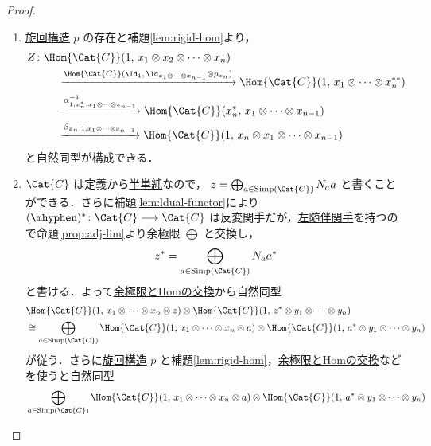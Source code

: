 \documentclass[TQFT_main]{subfiles}
\begin{document}
\begin{proof}
    \begin{enumerate}
        \item \hyperref[def:pivotal]{旋回構造} $p$ の存在と補題\ref{lem:rigid-hom}より，
        \begin{align}
            Z &\colon \Hom{\Cat{C}} (1,\, x_1 \otimes x_2 \otimes \cdots \otimes x_n) \\
            &\qquad \xrightarrow{\Hom{\Cat{C}} (\Id_1,\, \Id_{x_1 \otimes \cdots \otimes x_{n-1}} \otimes p_{x_n})} \Hom{\Cat{C}} (1,\, x_1 \otimes \cdots \otimes x_n^{**})  \\
            &\qquad \xrightarrow{\alpha_{1,x_n^*,x_1\otimes \cdots \otimes x_{n-1}}^{-1}} \Hom{\Cat{C}} (x_n^{*},\, x_1 \otimes \cdots \otimes x_{n-1}) \\
            &\qquad \xrightarrow{\beta_{x_n,1,x_1 \otimes \cdots \otimes x_{n-1}}} \Hom{\Cat{C}} (1,\, x_n \otimes x_1 \otimes \cdots \otimes x_{n-1})
        \end{align}
        と自然同型が構成できる．
        \item $\Cat{C}$ は定義から\hyperref[def:semisimple-cat]{半単純}なので，
        $z = \bigoplus_{a \in \mathrm{Simp}(\Cat{C})} N_a a$ と書くことができる．さらに補題\ref{lem:ldual-functor}により $(\mhyphen)^* \colon \Cat{C} \lto \Cat{C}$ は反変関手だが，\hyperref[def:adjoint]{左随伴関手}を持つので命題\ref{prop:adj-lim}より余極限 $\bigoplus$ と交換し，
        \begin{align}
            z^* = \bigoplus_{a \in \mathrm{Simp}(\Cat{C})} N_a a^*
        \end{align}
        と書ける．よって\hyperref[prop:lim-colim-basic]{余極限とHomの交換}から自然同型
        \begin{align}
            &\Hom{\Cat{C}} (1,\, x_1 \otimes \cdots \otimes x_n \otimes z) \otimes  \Hom{\Cat{C}}(1,\, z^* \otimes y_1 \otimes \cdots \otimes y_n) \\
            &\cong \bigoplus_{a \in \mathrm{Simp}(\Cat{C})} \Hom{\Cat{C}} (1,\, x_1 \otimes \cdots \otimes x_n \otimes a) \otimes  \Hom{\Cat{C}}(1,\, a^* \otimes y_1 \otimes \cdots \otimes y_n)
        \end{align}
        が従う．さらに\hyperref[def:pivotal]{旋回構造} $p$ と補題\ref{lem:rigid-hom}，\hyperref[prop:lim-colim-basic]{余極限とHomの交換}などを使うと自然同型
        \begin{align}
            &\bigoplus_{a \in \mathrm{Simp}(\Cat{C})} \Hom{\Cat{C}} (1,\, x_1 \otimes \cdots \otimes x_n \otimes a) \otimes  \Hom{\Cat{C}}(1,\, a^* \otimes y_1 \otimes \cdots \otimes y_n) \\

\end{align}
\end{enumerate}
\end{proof}
\end{document}

